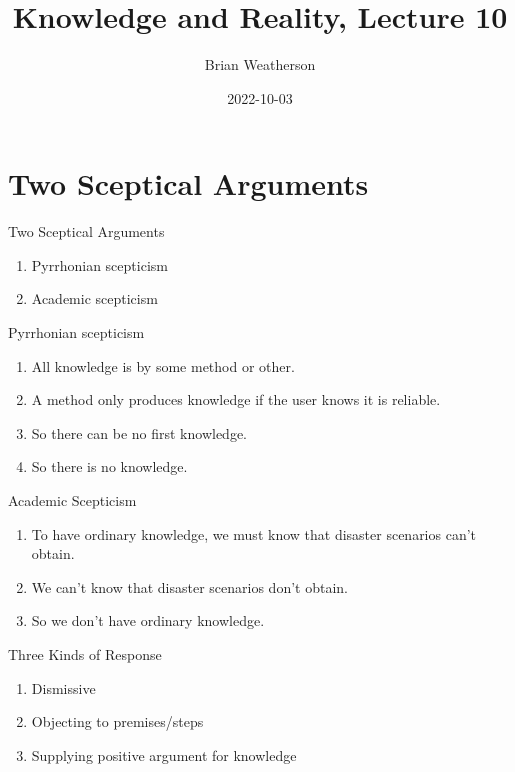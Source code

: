 \documentclass[
  17pt,
  letterpaper,
  ignorenonframetext,
  aspectratio=169,
  handout]{beamer}
\title{Knowledge and Reality, Lecture 10}
\author{Brian Weatherson}
\date{2022-10-03}
\providecommand{\tightlist}{%
  \setlength{\itemsep}{0pt}\setlength{\parskip}{0pt}}\usepackage{longtable,booktabs,array}
\begin{document}
\frame{\titlepage}
\ifdefined\Shaded\renewenvironment{Shaded}{\begin{tcolorbox}[interior hidden, enhanced, borderline west={3pt}{0pt}{shadecolor}, boxrule=0pt, breakable, frame hidden, sharp corners]}{\end{tcolorbox}}\fi

\hypertarget{two-sceptical-arguments}{%
\section{Two Sceptical Arguments}\label{two-sceptical-arguments}}

\begin{frame}{Two Sceptical Arguments}
\protect\hypertarget{two-sceptical-arguments-1}{}
\begin{enumerate}[<+->]
\tightlist
\item
  Pyrrhonian scepticism
\item
  Academic scepticism
\end{enumerate}
\end{frame}

\begin{frame}{Pyrrhonian scepticism}
\protect\hypertarget{pyrrhonian-scepticism}{}
\begin{enumerate}[<+->]
\tightlist
\item
  All knowledge is by some method or other.
\item
  A method only produces knowledge if the user knows it is reliable.
\item
  So there can be no first knowledge.
\item
  So there is no knowledge.
\end{enumerate}
\end{frame}

\begin{frame}{Academic Scepticism}
\protect\hypertarget{academic-scepticism}{}
\begin{enumerate}[<+->]
\tightlist
\item
  To have ordinary knowledge, we must know that disaster scenarios can't
  obtain.
\item
  We can't know that disaster scenarios don't obtain.
\item
  So we don't have ordinary knowledge.
\end{enumerate}
\end{frame}

\begin{frame}{Three Kinds of Response}
\protect\hypertarget{three-kinds-of-response}{}
\begin{enumerate}[<+->]
\tightlist
\item
  Dismissive
\item
  Objecting to premises/steps
\item
  Supplying positive argument for knowledge
\end{enumerate}
\end{frame}
\end{document}
